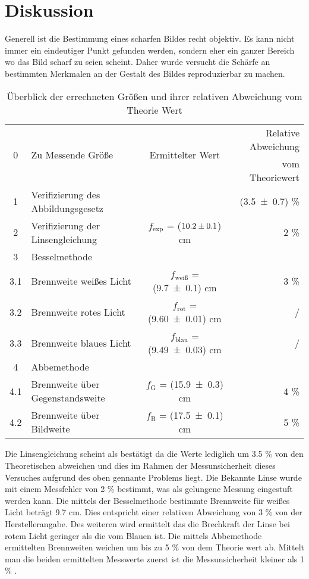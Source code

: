 \section{Diskussion}
\label{sec:Diskussion}
Generell ist die Bestimmung eines scharfen Bildes recht objektiv. Es kann nicht immer ein eindeutiger Punkt gefunden werden, sondern eher ein ganzer Bereich wo das Bild scharf zu seien scheint. Daher wurde versucht die Schärfe an bestimmten Merkmalen an der Gestalt des Bildes reproduzierbar zu machen. 
\begin{table}
  \centering
  \begin{tabular}{c| l | c |r}
    \toprule
    \multirow{2}{*}{0} & \multirow{2}{*}{Zu Messende Größe} & \multirow{2}{*}{Ermittelter Wert} & Relative Abweichung \\
 	& & & vom Theoriewert \\
    \midrule
    	1 & Verifizierung des Abbildungsgesetz & & (\num{3.5 +- 0.7}) \% \\
	2 & Verifizierung der Linsengleichung & $f_\text{exp}$ = ($\num{10.2 +- 0.1}$) cm & 2 \% \\
	3 & Besselmethode & & \\
	3.1 &Brennweite weißes Licht & $f_\text{weiß}$ = (\num{9.7 +- 0.1}) cm & 3 \% \\
	3.2 &Brennweite rotes Licht  & $f_\text{rot}$  = (\num{9.60 +- 0.01}) cm & / \\
	3.3 &Brennweite blaues Licht & $f_\text{blau}$ = (\num{9.49 +- 0.03}) cm & / \\
	4 & Abbemethode & & \\
	4.1 & Brennweite über Gegenstandsweite& $f_\text{G}$ = (\num{15.9 +- 0.3}) cm &  4 \% \\
	4.2 & Brennweite über Bildweite & $f_\text{B}$ = (\num{17.5 +- 0.1}) cm & 5 \% \\
    \bottomrule
  \end{tabular}
  \caption{Überblick der errechneten Größen und ihrer relativen Abweichung vom Theorie Wert}
  \label{tab:über}
\end{table}
Die Linsengleichung scheint als bestätigt da die Werte lediglich um 3.5 \% von den Theoretischen abweichen und dies im Rahmen der Messunsicherheit dieses Versuches aufgrund des oben gennante Problems liegt.
Die Bekannte Linse wurde mit einem Messfehler von 2 \% bestimmt, was als gelungene Messung eingestuft werden kann. 
Die mittels der Besselmethode bestimmte Brennweite für weißes Licht beträgt 9.7 cm. Dies entspricht einer relativen Abweichung von 3 \% von der Herstellerangabe. Des weiteren wird ermittelt das die Brechkraft der Linse bei rotem Licht geringer als die vom Blauen ist.
Die mittels Abbemethode ermittelten Brennweiten weichen um bis zu 5 \% von dem Theorie wert ab. Mittelt man die beiden ermittelten Messwerte zuerst ist die Messunsicherheit kleiner als 1 \% . 


